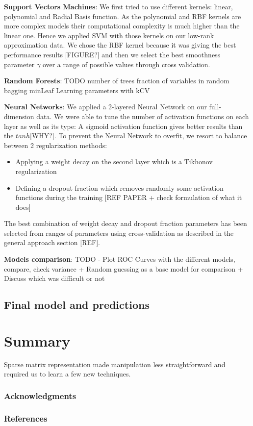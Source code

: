 \documentclass{article}
\begin{document}
    \textbf{Support Vectors Machines}: We first tried to use different kernels: linear, polynomial and Radial Basis function. As the polynomial and RBF kernels are more complex models their computational complexity is much higher than the linear one. Hence we applied SVM with those kernels on our low-rank approximation data. We chose the RBF kernel because it was giving the best performance results [FIGURE?] and then we select the best smoothness parameter $\gamma$ over a range of possible values through cross validation.

    \textbf{Random Forests}: TODO
    number of trees
    fraction of variables in random bagging
    minLeaf
    Learning parameters with kCV

   \textbf{Neural Networks}: We applied a 2-layered Neural Network on our full-dimension data. We were able to tune the number of activation functions on each layer as well as its type: A sigmoid activation function gives better results than the $tanh$[WHY?]. To prevent the Neural Network to overfit, we resort to balance between 2 regularization methods:
   \begin{itemize}
    	\item Applying a weight decay on the second layer which is a Tikhonov regularization
	\item Defining a dropout fraction which removes randomly some activation functions during the training [REF PAPER + check formulation of what it does]
    \end{itemize}
	The best combination of weight decay and dropout fraction parameters has been selected from ranges of parameters using cross-validation as described in the general approach section [REF].

   \textbf{Models comparison}: TODO
   - Plot ROC Curves with the different models, compare, check variance + Random guessing as a base model for comparison
   + Discuss which was difficult or not

  \subsection{Final model and predictions}



\section{Summary}
  Sparse matrix representation made manipulation less straightforward and required us to learn a few new techniques.

  \subsubsection*{Acknowledgments}

  \subsubsection*{References}
\end{document}
